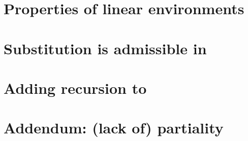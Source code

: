 \section{Properties of linear environments}\label{sec:lenv}

\section{Substitution is admissible in \name{}}\label{sec:lrsub}

\section{Adding recursion to \name{}}\label{sec:rec}

\section{Addendum: (lack of) partiality}\label{sec:part}

